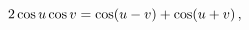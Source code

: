 \[2\mathop{\cos\/}\nolimits u\mathop{\cos\/}\nolimits v=\mathop{\cos\/}\nolimits%
\!\left(u-v\right)+\mathop{\cos\/}\nolimits\!\left(u+v\right),\]